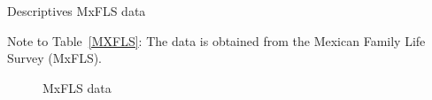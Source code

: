 \documentclass[a4paper, 11pt]{article}
\renewcommand{\thetable}{A\arabic{table}}
\renewcommand{\thefigure}{A\arabic{figure}}
\begin{document}
\begin{spacing}{1.4}
  \renewcommand{\thetable}{A\arabic{table}}
  \setcounter{table}{0}
    \renewcommand{\thefigure}{A\arabic{table}}
    \setcounter{figure}{0}
 \begin{table}[H]\caption{Descriptives MxFLS data}\label{MXFLS}
 	
 	\begin{threeparttable}
 		
 {\footnotesize  		}
 		{\scriptsize 	
 			\begin{tablenotes}
 				
 				\item Note to Table~\ref{MXFLS}: The data is obtained from the Mexican Family Life Survey (MxFLS).   
 			\end{tablenotes}}
 			
 		\end{threeparttable}
 		
 	\end{table}
   \begin{figure}[H]
   	
   	\centering	\caption{MxFLS data}
   	
   	\label{MxFLS_Graphs}
   	

\end{figure}
\end{spacing}
\end{document}
